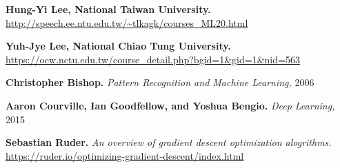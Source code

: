 \documentclass[../main.tex]{subfiles}
\begin{document}
    \begin{thebibliography}{9}
        \textbf{Hung-Yi Lee, National Taiwan University.}\\
        \url{http://speech.ee.ntu.edu.tw/~tlkagk/courses_ML20.html}
        
        \textbf{Yuh-Jye Lee, National Chiao Tung University.}\\
        \url{https://ocw.nctu.edu.tw/course_detail.php?bgid=1&gid=1&nid=563}

        \textbf{Christopher Bishop.}
        \textit{Pattern Recognition and Machine Learning,} 2006

        \textbf{Aaron Courville, Ian Goodfellow, and Yoshua Bengio.}
        \textit{Deep Learning,} 2015

        \textbf{Sebastian Ruder.}
        \textit{An overview of gradient descent optimization alogrithms.}\\
        \url{https://ruder.io/optimizing-gradient-descent/index.html}

    \end{thebibliography}
    
\end{document}
